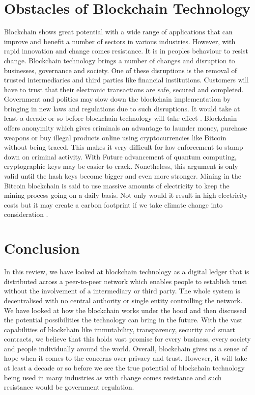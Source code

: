 \documentclass[report]{IEEEtran}
\begin{document}
\section{Obstacles of Blockchain Technology}
Blockchain shows great potential with a wide range of applications that can improve and benefit a number of sectors in various industries. However, with rapid innovation and change comes resistance. It is in peoples behaviour to resist change. Blockchain technology brings a number of changes and disruption to businesses, governance and society. One of these disruptions is the removal of trusted intermediaries and third parties like financial institutions. Customers will have to trust that their electronic transactions are safe, secured and completed. Government and politics may slow down the blockchain implementation by bringing in new laws and regulations due to such disruptions. It would take at least a decade or so before blockchain technology will take effect \cite{time}. Blockchain offers anonymity which gives criminals an advantage to launder money, purchase weapons or buy illegal products online using cryptocurrencies like Bitcoin without being traced. This makes it very difficult for law enforcement to stamp down on criminal activity. With Future advancement of quantum computing, cryptographic keys may be easier to crack. Nonetheless, this argument is only valid until the hash keys become bigger and even more stronger. Mining in the Bitcoin blockchain is said to use massive amounts of electricity to keep the mining process going on a daily basis. Not only would it result in high electricity costs but it may create a carbon footprint if we take climate change into consideration \cite{double}.

\section{Conclusion}
In this review, we have looked at blockchain technology as a digital ledger that is distributed across a peer-to-peer network which enables people to establish trust without the involvement of a intermediary or third party. The whole system is decentralised with no central authority or single entity controlling the network. We have looked at how the blockchain works under the hood and then discussed the potential possibilities the technology can bring in the future. With the vast capabilities of blockchain like immutability, transparency, security and smart contracts, we believe that this holds vast promise for every business, every society and people individually around the world. Overall, blockchain gives us a sense of hope when it comes to the concerns over privacy and trust. However, it will take at least a decade or so before we see the true potential of blockchain technology being used in many industries as with change comes resistance and such resistance would be government regulation. 
\end{document}
